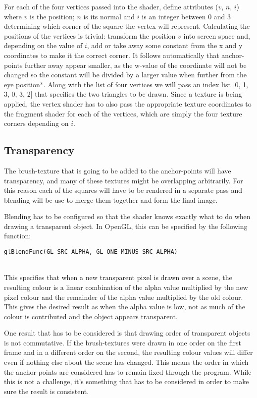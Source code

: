 \documentclass[a4paper, 12pt]{article}
\begin{document}
For each of the four vertices passed into the shader, define attributes ($v$, $n$, $i$) where $v$ is the position; $n$ is its normal and $i$ is an integer between 0 and 3 determining which corner of the square the vertex will represent. Calculating the positions of the vertices is trivial: transform the position $v$ into screen space and, depending on the value of $i$, add or take away some constant from the x and y coordinates to make it the correct corner. It follows automatically that anchor-points further away appear smaller, as the w-value of the coordinate will not be changed so the constant will be divided by a larger value when further from the eye position*. Along with the list of four vertices we will pass an index list [0, 1, 3, 0, 3, 2] that specifies the two triangles to be drawn. Since a texture is being applied, the vertex shader has to also pass the appropriate texture coordinates to the fragment shader for each of the vertices, which are simply the four texture corners depending on $i$.


\subsection{Transparency}
The brush-texture that is going to be added to the anchor-points will have transparency, and many of these textures might be overlapping arbitrarily. For this reason each of the squares will have to be rendered in a separate pass and blending will be use to merge them together and form the final image.

Blending has to be configured so that the shader knows exactly what to do when drawing a transparent object. In OpenGL, this can be specified by the following function:\\
\centerline{\texttt{glBlendFunc(GL\_SRC\_ALPHA, GL\_ONE\_MINUS\_SRC\_ALPHA)\;}}\\
This specifies that when a new transparent pixel is drawn over a scene, the resulting colour is a linear combination of the alpha value multiplied by the new pixel colour and the remainder of the alpha value multiplied by the old colour. This gives the desired result as when the alpha value is low, not as much of the colour is contributed and the object appears transparent.

One result that has to be considered is that drawing order of transparent objects is not commutative. If the brush-textures were drawn in one order on the first frame and in a different order on the second, the resulting colour values will differ even if nothing else about the scene has changed. This means the order in which the anchor-points are considered has to remain fixed through the program. While this is not a challenge, it's something that has to be considered in order to make sure the result is consistent.
\end{document}
